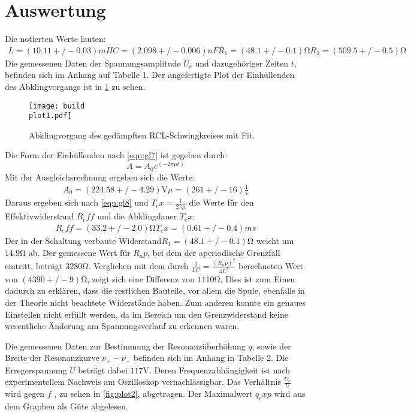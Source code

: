 \section{Auswertung}
\label{sec:Auswertung}
Die notierten Werte lauten:
\begin{align}
L = (10.11 +/- 0.03) mH 
C = (2.098 +/- 0.006) nF
R_1 = (48.1 +/- 0.1) \si{\ohm}
R_2 = (509.5 +/- 0.5) \si{\ohm}
\end{align}
Die gemessenen Daten der Spannungsamplitude $U_c$ und dazugehöriger Zeiten $t$,
befinden sich im Anhang auf Tabelle 1.
Der angefertigte Plot der Einhüllenden des Abklingvorgangs ist in \ref{fig:plot1} zu sehen.
\begin{figure}
  \centering
  \texttt{[image: build\\plot1.pdf]}
  \caption{Abklingvorgang des gedämpften RCL-Schwingkreises mit Fit.}
  \label{fig:plot1}
\end{figure}

Die Form der Einhüllenden nach \ref{eqn:gl7} ist gegeben durch:
\begin{equation}
  A = A_0 e^(-2 \pi \mu t)
\end{equation}
Mit der Ausgleichsrechnung ergeben sich die Werte:
\begin{align}
  A_0 = (224.58 +/- 4.29) \si{\volt}
  \mu = (261 +/- 16) \frac{1}{s}
\end{align}
Daraus ergeben sich nach \ref{eqn:gl8} und $T_ex = \frac{1}{2 \pi \mu}$ die Werte für den Effektivwiderstand $R_eff$ und die Abklingdauer $T_ex$:
\begin{align}
  R_eff = (33.2 +/- 2.0) \si{\ohm}
  T_ex = (0.61 +/- 0.4) ms
\end{align}
Der in der Schaltung verbaute Widerstand$R_1 = (48.1 +/- 0.1) \si{\ohm}$ weicht um $14.9 \si{\ohm}$ ab.
Der gemessene Wert für $R_ap$, bei dem der aperiodische Grenzfall eintritt, beträgt $3280 \si{\ohm}$.
Verglichen mit dem durch $\frac{1}{LC} = \frac{(R_ap)^2}{4L^2}$ berechneten Wert von $(4390 +/- 9) \si{\ohm}$, zeigt sich eine Differenz von $1110 \si{\ohm}$.
Dies ist zum Einen dadurch zu erklären, dass die restlichen Bauteile, vor allem die Spule, ebenfalls in der Theorie nicht beachtete Widerstände haben.
Zum anderen konnte ein genaues Einstellen nicht erfüllt werden, da im Bereich um den Grenzwiderstand keine wesentliche Änderung am Spannungsverlauf zu erkennen waren.

Die gemessenen Daten zur Bestimmung der Resonanzüberhöhung $q$, sowie der Breite der Resonanzkurve $\nu_+ - \nu_-$ befinden sich im Anhang in Tabelle 2.
Die Erregerspannung $U$ beträgt dabei $117 \si{\volt}$.
Deren Frequenzabhängigkeit ist nach experimentellem Nachweis am Oszilloskop vernachlässigbar.
Das Verhältnis $\frac{U_c}{U}$ wird gegen $f$ , zu sehen in \ref{fig:plot2}, abgetragen.
Der Maximalwert $q_exp$ wird aus dem Graphen als Güte abgelesen.

